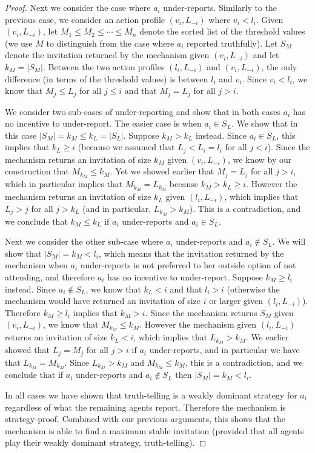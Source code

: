 \begin{proof}
	Next we consider the case where $a_i$ under-reports. Similarly to the previous case, we consider an action profile $(v_i, L_{-i})$ where $v_i < l_i$. Given $(v_i, L_{-i})$, let $M_1 \leq M_2 \leq \cdots \leq M_{n}$ denote the sorted list of the threshold values (we use $M$ to distinguish from the case where $a_i$ reported truthfully). Let $S_M$ denote the invitation returned by the mechanism given $(v_i, L_{-i})$ and let $k_M = |S_M|$. Between the two action profiles $(l_i, L_{-i})$ and $(v_i, L_{-i})$, the only difference (in terms of the threshold values) is between $l_i$ and $v_i$. Since $v_i < l_i$, we know that $M_j \leq L_j$ for all $j \leq i$ and that $M_j = L_j$ for all $j > i$. 

	We consider two sub-cases of under-reporting and show that in both cases $a_i$ has no incentive to under-report.  The easier case is when $a_i \in S_L$. We show that in this case $|S_M| = k_M \leq k_L = |S_L|$. Suppose $k_M > k_L$ instead. Since $a_i \in S_L$, this implies that $k_L \geq i$ (because we assumed that $L_j < L_i = l_i$ for all $j < i$). Since the mechanism returns an invitation of size $k_M$ given $(v_i, L_{-i})$, we know by our construction that $M_{k_M} \leq k_M$. Yet we showed earlier that $M_j = L_j$ for all $j > i$, which in particular implies that $M_{k_M} = L_{k_M}$ because $k_M > k_L \geq i$. However the mechanism returns an invitation of size $k_L$ given $(l_i, L_{-i})$, which implies that $L_j > j$ for all $j > k_L$ (and in particular, $L_{k_M} > k_M$). This is a contradiction, and we conclude that $k_M \leq k_L$ if $a_i$ under-reports and $a_i\in S_L$. 

	Next we consider the other sub-case where $a_i$ under-reports and $a_i\not\in S_L$. We will show that $|S_M| = k_M < l_i$, which means that the invitation returned by the mechanism when $a_i$ under-reports is not preferred to her outside option of not attending, and therefore $a_i$ has no incentive to under-report. Suppose $k_M \geq l_i$ instead. Since $a_i \not\in S_L$, we know that $k_L < i$ and that $l_i > i$ (otherwise the mechanism would have returned an invitation of size $i$ or larger given $(l_i, L_{-i})$). Therefore $k_M \geq l_i$ implies that $k_M > i$. Since the mechanism returns $S_M$ given $(v_i, L_{-i})$, we know that $M_{k_M} \leq k_M$. However the mechanism given $(l_i, L_{-i})$ returns an invitation of size $k_L < i$, which implies that $L_{k_M} > k_M$. We earlier showed that $L_j = M_j$ for all $j > i$ if $a_i$ under-reports, and in particular we have that $L_{k_M} = M_{k_M}$. Since $L_{k_M} > k_M$ and $M_{k_M} \leq k_M$, this is a contradiction, and we conclude that if $a_i$ under-reports and $a_i\not\in S_L$ then $|S_M| = k_M < l_i$. 

	In all cases we have shown that truth-telling is a weakly dominant strategy for $a_i$ regardless of what the remaining agents report. Therefore the mechanism is strategy-proof.  Combined with our previous arguments, this shows that the mechanism is able to find a maximum stable invitation (provided that all agents play their weakly dominant strategy, truth-telling).
\end{proof}

